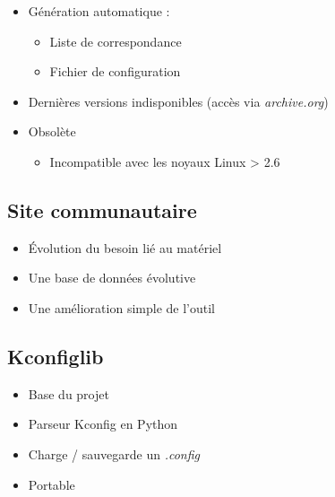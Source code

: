 \documentclass[11pt]{beamer}
\begin{document}
\begin{frame}
    \begin{itemize}
        \item Génération automatique :
            \begin{itemize}
                \item Liste de correspondance
                \item Fichier de configuration
            \end{itemize}
    	\vspace{0.5cm}
        \item Dernières versions indisponibles (accès via \textit{archive.org})
    	\vspace{0.5cm}
        \item Obsolète
            \begin{itemize}
                \item Incompatible avec les noyaux Linux > 2.6
            \end{itemize}
    \end{itemize}
\end{frame}

\subsection{Site communautaire}
\begin{frame}
    \begin{itemize}
        \item Évolution du besoin lié au matériel
    	\vspace{0.5cm}
        \item Une base de données évolutive
    	\vspace{0.5cm}
        \item Une amélioration simple de l'outil
    \end{itemize}
\end{frame}


\subsection{Kconfiglib}
\begin{frame}
    \begin{itemize}
        \item Base du projet
    	\vspace{0.5cm}
        \item Parseur Kconfig en Python
    	\vspace{0.5cm}
        \item Charge / sauvegarde un \textit{.config}
    	\vspace{0.5cm}
        \item Portable
    \end{itemize}
\end{frame}
\end{document}
